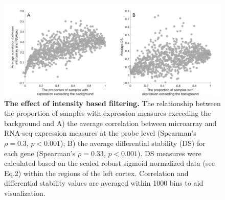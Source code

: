\documentclass[10pt,A4]{article}
\begin{document}
\begin{figure}[h!]
  \centering
    \includegraphics[width=1\textwidth]{FigureS2.pdf}
\caption{\textbf{The effect of intensity based filtering.}
The relationship between the proportion of samples with expression measures exceeding the background and A) the average correlation between microarray and RNA-seq expression measures at the probe level (Spearman’s $\rho = 0.3$, $p<0.001$); B) the average differential stability (DS) for each gene (Spearman’s $\rho = 0.33$, $p<0.001$). DS measures were calculated based on the scaled robust sigmoid normalized data (see Eq.2) within the regions of the left cortex. Correlation and differential stability values are averaged within 1000 bins to aid visualization.}
\label{FigS2}
\end{figure}
\end{document}

